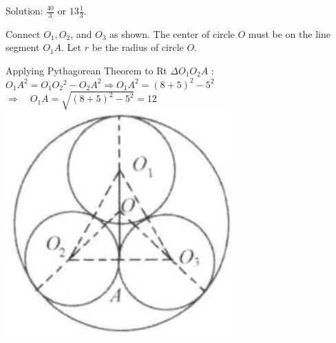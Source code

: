 \documentclass[10pt]{article}
\begin{document}
Solution: \(\frac{40}{3}\) or \(13 \frac{1}{3}\).


Connect \(O_{1}, O_{2}\), and \(O_{3}\) as shown. The center of circle \(O\) must be on the line segment \(O_{1} A\). Let \(r\) be the radius of circle \(O\).

Applying Pythagorean Theorem to Rt \(\Delta O_{1} O_{2} A\) :\\
\(O_{1} A^{2}=O_{1} O_{2}{ }^{2}-O_{2} A^{2} \Rightarrow O_{1} A^{2}=(8+5)^{2}-5^{2}\)\\
\(\Rightarrow \quad O_{1} A=\sqrt{(8+5)^{2}-5^{2}}=12\)\\
\includegraphics[max width=\textwidth, center]{2025_04_17_97bc1f7e44d93c271a88g-180(1)}
\end{document}
